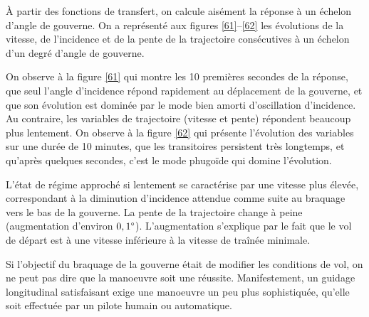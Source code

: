 \documentclass{report}
\begin{document}
À partir des fonctions de transfert, on calcule aisément la réponse à un échelon d’angle de gouverne. On a représenté aux figures \ref{61}–\ref{62} les évolutions de la vitesse, de l’incidence et de la pente de la trajectoire consécutives à un échelon d’un degré d’angle de gouverne. 

On observe à la figure \ref{61} qui montre les 10 premières secondes de la réponse,
que seul l’angle d’incidence répond rapidement au déplacement de la gouverne, et que son évolution est dominée par le mode bien amorti d’oscillation d’incidence. Au contraire, les variables de trajectoire (vitesse et pente) répondent beaucoup plus lentement. On observe à la figure \ref{62} qui présente l’évolution des variables sur une durée de 10 minutes, que les transitoires persistent très longtemps, et qu’après quelques secondes, c’est le mode phugoïde qui domine
l’évolution.

L’état de régime approché si lentement se caractérise par une vitesse plus élevée, correspondant à la diminution d’incidence attendue comme suite au braquage vers le bas de la gouverne. La pente de la trajectoire change à peine (augmentation d’environ $0,1\degree$). L’augmentation s’explique par le fait que le vol de départ est à une vitesse inférieure à la vitesse de traînée minimale.

Si l’objectif du braquage de la gouverne était de modifier les conditions de vol, on ne peut pas dire que la manoeuvre soit une réussite. Manifestement, un guidage longitudinal satisfaisant exige une manoeuvre un peu plus sophistiquée, qu’elle soit effectuée par un pilote humain ou automatique.
\end{document}
